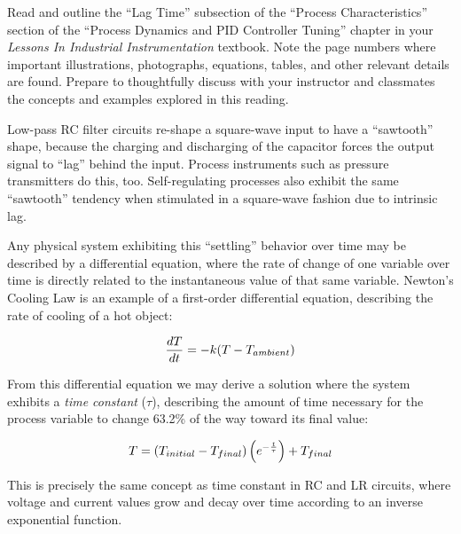 

Read and outline the ``Lag Time'' subsection of the ``Process Characteristics'' section of the ``Process Dynamics and PID Controller Tuning'' chapter in your {\it Lessons In Industrial Instrumentation} textbook.  Note the page numbers where important illustrations, photographs, equations, tables, and other relevant details are found.  Prepare to thoughtfully discuss with your instructor and classmates the concepts and examples explored in this reading.














Low-pass RC filter circuits re-shape a square-wave input to have a ``sawtooth'' shape, because the charging and discharging of the capacitor forces the output signal to ``lag'' behind the input.  Process instruments such as pressure transmitters do this, too.  Self-regulating processes also exhibit the same ``sawtooth'' tendency when stimulated in a square-wave fashion due to intrinsic lag.  

Any physical system exhibiting this ``settling'' behavior over time may be described by a differential equation, where the rate of change of one variable over time is directly related to the instantaneous value of that same variable.  Newton's Cooling Law is an example of a first-order differential equation, describing the rate of cooling of a hot object:

$${dT \over dt} = -k (T - T_{ambient})$$

From this differential equation we may derive a solution where the system exhibits a {\it time constant} ($\tau$), describing the amount of time necessary for the process variable to change 63.2\% of the way toward its final value:

$$T = \left( T_{initial} - T_{final} \right) \left( e^{-{t \over \tau}} \right) + T_{final}$$

This is precisely the same concept as time constant in RC and LR circuits, where voltage and current values grow and decay over time according to an inverse exponential function.

